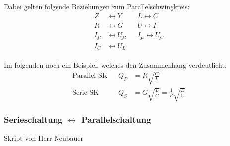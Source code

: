 Dabei gelten folgende Beziehungen zum Parallelschwingkreis:
\begin{align}
\underline{Z} &\leftrightarrow \underline{Y} && L \leftrightarrow C\nonumber\\
R &\leftrightarrow G && \underline{U} \leftrightarrow \underline{I}\nonumber\\
\underline{I_R} &\leftrightarrow \underline{U_R} && \underline{I_L}
\leftrightarrow \underline{U_C}\nonumber\\
\underline{I_C} &\leftrightarrow \underline{U_L}\nonumber
\end{align}

Im folgenden noch ein Beispiel, welches den Zusammenhang verdeutlicht:
\begin{align}
\text{Parallel-SK} && Q_P&=R\sqrt{\frac{C}{L}}\nonumber\\
\text{Serie-SK} &&
Q_S&=G\sqrt{\frac{L}{C}}=\frac{1}{R}\sqrt{\frac{L}{C}}\nonumber
\end{align}

\subsubsection{Serieschaltung $\leftrightarrow$ Parallelschaltung}
Skript von Herr Neubauer